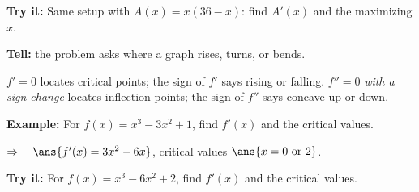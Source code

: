 \documentclass[12pt]{article}
\begin{document}
\begin{tryitbox}
\textbf{Try it:} \quad Same setup with $A(x) = x(36 - x)$: find $A'(x)$ and the
maximizing $x$.\\[2pt]
\end{tryitbox}


\begin{formulabox}
\textbf{Tell:} the problem asks where a graph rises, turns, or bends.\par
$f' = 0$ locates critical points; the sign of $f'$ says rising or falling.
$f'' = 0$ \emph{with a sign change} locates inflection points; the sign of
$f''$ says concave up or down.
\end{formulabox}

\begin{examplebox}
\textbf{Example:} \quad For $f(x) = x^3 - 3x^2 + 1$, find $f'(x)$ and the
critical values.

$\Rightarrow\quad \ans{f'(x) = 3x^2 - 6x}$, \quad critical values $\ans{x = 0 \text{ or } 2}$.
\end{examplebox}

\begin{tryitbox}
\textbf{Try it:} \quad For $f(x) = x^3 - 6x^2 + 2$, find $f'(x)$ and the
critical values.\\[2pt]
\end{tryitbox}
\end{document}
